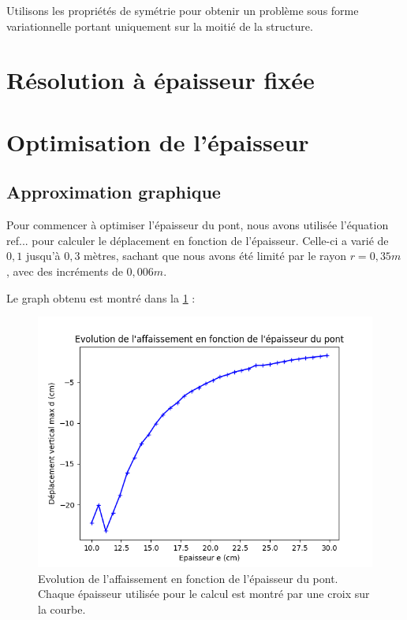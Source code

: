 \documentclass{article}
\begin{document}
    \begin{solution}   
        
    \end{solution}

    \begin{problem}{2}
    Utilisons les propriétés de symétrie pour obtenir un problème sous forme variationnelle portant uniquement sur la moitié de la structure.
    \end{problem}
    
    \begin{solution}   
        
    \end{solution}

    \section{Résolution à épaisseur fixée}
        
    \section{Optimisation de l'épaisseur}

    \subsection{Approximation graphique}
    
    Pour commencer à optimiser l'épaisseur du pont, nous avons utilisée l'équation ref{...} pour calculer le déplacement en fonction de l'épaisseur. Celle-ci a varié 	de $0,1$ jusqu'à $0,3$ mètres, sachant que nous avons été limité par le rayon $r = 0,35 m$, avec des incréments de $0,006 m$.
    
    Le graph obtenu est montré dans la \ref{fig:graph} :
    \begin{figure}[H]        
    \begin{center}
	
        \includegraphics[width=12cm]{imgs/graph.png}
        \caption{Evolution de l'affaissement en fonction de l'épaisseur du pont. Chaque épaisseur utilisée pour le calcul est montré par une croix sur la courbe.}
        \label{fig:graph}
    
	\end{center}
    \end{figure}
    
\end{document}
